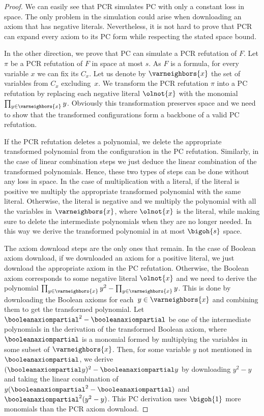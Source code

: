 \documentclass[11pt]{article}
\numberwithin{equation}{section}
\theoremstyle{definition}
\theoremstyle{plain}
\begin{document}
\begin{proof}
  We can easily see that PCR simulates PC with only a constant loss in
  space. The only problem in the simulation could arise when
  downloading an axiom that has negative literals. Nevertheless, it is
  not hard to prove that PCR can expand every axiom to its PC form
  while respecting the stated space bound.

  In the other direction, we prove that PC can simulate a PCR
  refutation of $F$. Let $\pi$ be a PCR refutation of $F$ in space at
  most $s$. As $F$ is a \varweightconstrained{} formula, for every
  variable $x$ we can fix its  $C_x$. Let us
  denote by $\varneighbors{x}$ the set of variables from $C_x$
  excluding~$x$. We transform the PCR refutation $\pi$ into a PC
  refutation by replacing each negative literal $\olnot{x}$ with the
  monomial $\prod_{y \in \varneighbors{x}} y$. Obviously this
  transformation preserves space and we need to show that the
  transformed configurations form a backbone of a valid PC refutation.

  If the PCR refutation deletes a polynomial, we delete the
  appropriate transformed polynomial from the configuration in the
  PC refutation. Similarly, in the case of linear combination steps we
  just deduce the linear combination of the transformed
  polynomials. Hence, these two types of steps can be done without any
  loss in space. In the case of multiplication with a literal, if the
  literal is positive we multiply the appropriate transformed
  polynomial with the same literal. Otherwise, the literal is negative
  and we multiply the polynomial with all the variables in
  $\varneighbors{x}$, where $\olnot{x}$ is the literal, while making
  sure to delete the intermediate polynomials when they are no longer
  needed. In this way we derive the transformed polynomial in at most
  $\bigoh{s}$ space.

  The axiom download steps are the only ones that remain. In the case
  of Boolean axiom download, if we downloaded an axiom for a positive
  literal, we just download the appropriate axiom in the PC
  refutation. Otherwise, the Boolean axiom corresponds to some
  negative literal $\olnot{x}$ and we need to derive the polynomial
  $\prod_{y \in \varneighbors{x}} y^2 - \prod_{y \in \varneighbors{x}}
  y$. This is done by downloading the Boolean axioms for each~$y \in
  \varneighbors{x}$ and combining them to get the transformed
  polynomial. Let $\booleanaxiompartial^2 - \booleanaxiompartial$ be
  one of the intermediate polynomials in the derivation of the
  transformed Boolean axiom, where $\booleanaxiompartial$ is a
  monomial formed by multiplying the variables in some subset of
  $\varneighbors{x}$. Then, for some variable $y$ not mentioned in
  $\booleanaxiompartial$, we derive $(\booleanaxiompartial y)^2 -
  \booleanaxiompartial y$ by downloading $y^2 - y$ and taking the
  linear combination of $y(\booleanaxiompartial^2 -
  \booleanaxiompartial)$ and $\booleanaxiompartial^2(y^2 - y)$. This
  PC derivation uses $\bigoh{1}$ more monomials than the PCR axiom
  download.


\end{proof}
\end{document}
